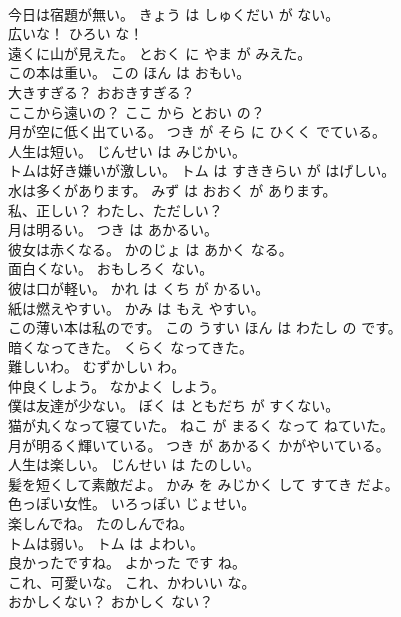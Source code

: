 \documentclass[8pt]{extreport}
\begin{document}
\begin{CJK}{UTF8}{min}
\\	今日は宿題が無い。	きょう は しゅくだい が ない。	
\\	広いな！	ひろい な！	
\\	遠くに山が見えた。	とおく に やま が みえた。	
\\	この本は重い。	この ほん は おもい。	
\\	大きすぎる？	おおきすぎる？	
\\	ここから遠いの？	ここ から とおい の？	
\\	月が空に低く出ている。	つき が そら に ひくく でている。	
\\	人生は短い。	じんせい は みじかい。	
\\	トムは好き嫌いが激しい。	トム は すききらい が はげしい。	
\\	水は多くがあります。	みず は おおく が あります。	
\\	私、正しい？	わたし、ただしい？	
\\	月は明るい。	つき は あかるい。	
\\	彼女は赤くなる。	かのじょ は あかく なる。	
\\	面白くない。	おもしろく ない。	
\\	彼は口が軽い。	かれ は くち が かるい。	
\\	紙は燃えやすい。	かみ は もえ やすい。	
\\	この薄い本は私のです。	この うすい ほん は わたし の です。	
\\	暗くなってきた。	くらく なってきた。	
\\	難しいわ。	むずかしい わ。	
\\	仲良くしよう。	なかよく しよう。	
\\	僕は友達が少ない。	ぼく は ともだち が すくない。	
\\	猫が丸くなって寝ていた。	ねこ が まるく なって ねていた。	
\\	月が明るく輝いている。	つき が あかるく かがやいている。	
\\	人生は楽しい。	じんせい は たのしい。	
\\	髪を短くして素敵だよ。	かみ を みじかく して すてき だよ。	
\\	色っぽい女性。	いろっぽい じょせい。	
\\	楽しんでね。	たのしんでね。	
\\	トムは弱い。	トム は よわい。	
\\	良かったですね。	よかった です ね。	
\\	これ、可愛いな。	これ、かわいい な。	
\\	おかしくない？	おかしく ない？	

\end{CJK}
\end{document}
